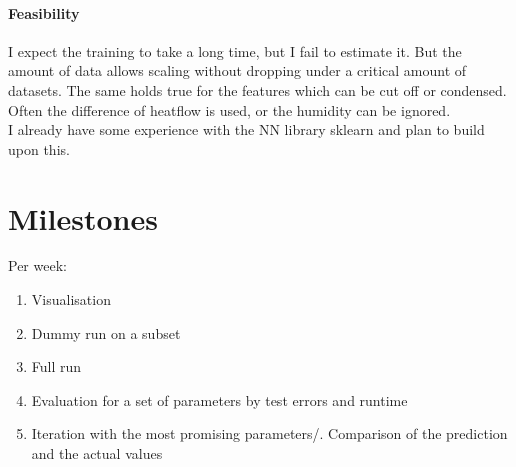 \documentclass[	DIV=calc,%
				paper=a4,%
				fontsize=11pt,%
				twocolumn]{scrartcl}	 %
\begin{document}
\paragraph{Feasibility}
I expect the training to take a long time, but I fail to estimate it. But the amount of data allows scaling without dropping under a critical amount of datasets. The same holds true for the features which can be cut off or condensed. Often the difference of heatflow is used, or the humidity can be ignored.\\
I already have some experience with the NN library sklearn and plan to build upon this.
\section{Milestones}
Per week:
\begin{enumerate}
\item Visualisation
\item Dummy run on a subset
\item Full run
\item Evaluation for a set of parameters by test errors and runtime
\item Iteration with the most promising parameters/. Comparison of the prediction and the actual values
\end{enumerate}
\end{document}
